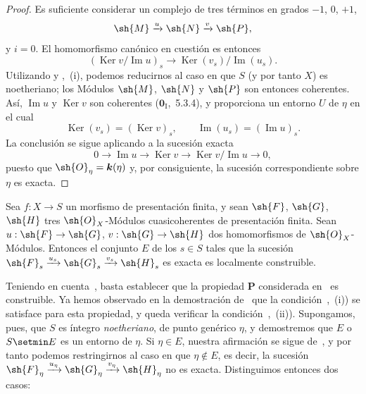 
\begin{proof}
Es suficiente considerar un complejo de tres términos en grados $-1$, $0$, $+1$,
\[
 \sh{M}\xrightarrow{u}\sh{N}\xrightarrow{v}\sh{P},
\]
y $i=0$.
El homomorfismo canónico en cuestión es entonces
\[
 (\operatorname{Ker}v/\operatorname{Im}u)_s
 \longrightarrow \operatorname{Ker}(v_s)/\operatorname{Im}(u_s).
\]
Utilizando  y ,~(i), podemos reducirnos al caso
en que $S$ (y por tanto $X$) es noetheriano; los Módulos $\sh{M}$, $\sh{N}$ y
$\sh{P}$ son entonces coherentes.
Así, $\operatorname{Im}u$ y $\operatorname{Ker}v$ son coherentes
($\mathbf{0}_{\mathrm{I}}$,~5.3.4), y  proporciona un entorno
$U$ de $\eta$ en el cual
\[
 \operatorname{Ker}(v_s)=(\operatorname{Ker}v)_s,
 \qquad
 \operatorname{Im}(u_s)=(\operatorname{Im}u)_s.
\]
La conclusión se sigue aplicando  a la sucesión exacta
\[
 0\longrightarrow\operatorname{Im}u\longrightarrow\operatorname{Ker}v
 \longrightarrow\operatorname{Ker}v/\operatorname{Im}u\longrightarrow0,
\]
puesto que $\sh{O}_\eta=\boldsymbol{k}(\eta)$ y, por consiguiente, la sucesión
correspondiente sobre $\eta$ es exacta.
\end{proof}

\begin{proposition}[9.4.4]
\label{IV.9.4.4}
Sea $f:X\to S$ un morfismo de presentación finita, y sean $\sh{F}$, $\sh{G}$, $\sh{H}$ tres $\sh{O}_X$-Módulos cuasicoherentes de presentación finita.
Sean $u:\sh{F}\to\sh{G}$, $v:\sh{G}\to\sh{H}$ dos homomorfismos de $\sh{O}_X$-Módulos.
Entonces el conjunto $E$ de los $s\in S$ tales que la sucesión $\sh{F}_s\xrightarrow{u_s}\sh{G}_s\xrightarrow{v_s}\sh{H}_s$ es exacta es localmente construible.
\end{proposition}

Teniendo en cuenta~, basta establecer que la propiedad $\boldsymbol{P}$ considerada en~ es construible.
Ya hemos observado en la demostración de~ que la condición~,~(i)) se satisface para esta propiedad, y queda verificar la condición~,~(ii)).
Supongamos, pues, que $S$ es íntegro \emph{noetheriano}, de punto genérico $\eta$, y demostremos que $E$ o $S\setmin E$ es un entorno de $\eta$.
Si $\eta\in E$, nuestra afirmación se sigue de~, y por tanto podemos restringirnos al caso en que $\eta\notin E$, es decir, la sucesión $\sh{F}_\eta\xrightarrow{u_\eta}\sh{G}_\eta\xrightarrow{v_\eta}\sh{H}_\eta$ no es exacta.
Distinguimos entonces dos casos:

